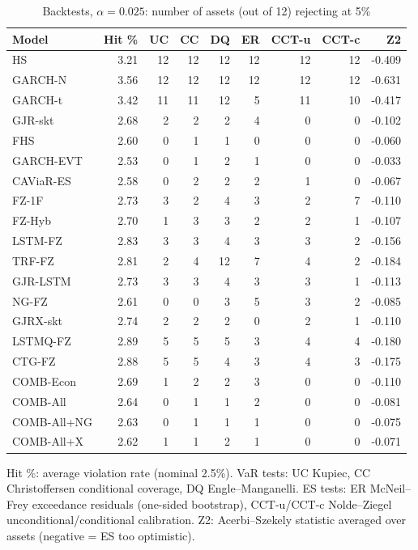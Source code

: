 \begin{table}[htbp]
\centering
\footnotesize
\caption{Backtests, $\alpha=0.025$: number of assets (out of 12) rejecting at 5\%}
\label{tab:bt_a025}
\begin{tabular}{lrrrrrrrr}
\toprule
Model & Hit \% & UC & CC & DQ & ER & CCT-u & CCT-c & Z2 \\
\midrule
HS & 3.21 & 12 & 12 & 12 & 12 & 12 & 12 & -0.409 \\
GARCH-N & 3.56 & 12 & 12 & 12 & 12 & 12 & 12 & -0.631 \\
GARCH-t & 3.42 & 11 & 11 & 12 & 5 & 11 & 10 & -0.417 \\
GJR-skt & 2.68 & 2 & 2 & 2 & 4 & 0 & 0 & -0.102 \\
FHS & 2.60 & 0 & 1 & 1 & 0 & 0 & 0 & -0.060 \\
GARCH-EVT & 2.53 & 0 & 1 & 2 & 1 & 0 & 0 & -0.033 \\
CAViaR-ES & 2.58 & 0 & 2 & 2 & 2 & 1 & 0 & -0.067 \\
FZ-1F & 2.73 & 3 & 2 & 4 & 3 & 2 & 7 & -0.110 \\
FZ-Hyb & 2.70 & 1 & 3 & 3 & 2 & 2 & 1 & -0.107 \\
LSTM-FZ & 2.83 & 3 & 3 & 4 & 3 & 3 & 2 & -0.156 \\
TRF-FZ & 2.81 & 2 & 4 & 12 & 7 & 4 & 2 & -0.184 \\
GJR-LSTM & 2.73 & 3 & 3 & 4 & 3 & 3 & 1 & -0.113 \\
NG-FZ & 2.61 & 0 & 0 & 3 & 5 & 3 & 2 & -0.085 \\
GJRX-skt & 2.74 & 2 & 2 & 2 & 0 & 2 & 1 & -0.110 \\
LSTMQ-FZ & 2.89 & 5 & 5 & 5 & 3 & 4 & 4 & -0.180 \\
CTG-FZ & 2.88 & 5 & 5 & 4 & 3 & 4 & 3 & -0.175 \\
COMB-Econ & 2.69 & 1 & 2 & 2 & 3 & 0 & 0 & -0.110 \\
COMB-All & 2.64 & 0 & 1 & 1 & 2 & 0 & 0 & -0.081 \\
COMB-All+NG & 2.63 & 0 & 1 & 1 & 1 & 0 & 0 & -0.075 \\
COMB-All+X & 2.62 & 1 & 1 & 2 & 1 & 0 & 0 & -0.071 \\
\bottomrule
\end{tabular}
\par\smallskip\parbox{\linewidth}{\scriptsize Hit \%: average violation rate (nominal 2.5\%). VaR tests: UC Kupiec, CC Christoffersen conditional coverage, DQ Engle--Manganelli. ES tests: ER McNeil--Frey exceedance residuals (one-sided bootstrap), CCT-u/CCT-c Nolde--Ziegel unconditional/conditional calibration. Z2: Acerbi--Szekely statistic averaged over assets (negative = ES too optimistic).}
\end{table}